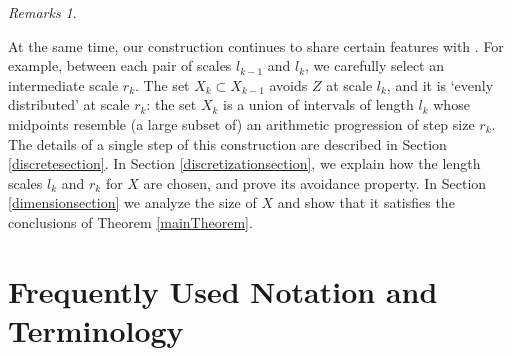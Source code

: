 \documentclass[dvipsnames,letterpaper,12pt]{article}
\numberwithin{equation}{section}
\theoremstyle{plain}
\theoremstyle{remark}
\newtheorem*{remarks}{Remarks}
\begin{document}
\begin{remarks}
\begin{enumerate}[1.]
		At the same time, our construction continues to share certain features with \cite{MalabikaRob}. For example, between each pair of scales $l_{k-1}$ and $l_{k}$, we carefully select an intermediate scale $r_{k}$. The set $X_{k}\subset X_{k-1}$ avoids $Z$ at scale $l_{k}$, and it is `evenly distributed' at scale $r_k$:
		the set $X_{k}$ is a union of intervals of length $l_{k}$ whose midpoints resemble (a large subset of) an arithmetic progression of step size $r_k$. The details of a single step of this construction are described in Section \ref{discretesection}. In Section \ref{discretizationsection}, we explain how the length scales $l_k$ and $r_k$ for $X$ are chosen, and prove its avoidance property. In Section \ref{dimensionsection} we analyze the size of $X$ and show that it satisfies the conclusions of Theorem \ref{mainTheorem}.
	\end{enumerate}
\end{remarks}










\section{Frequently Used Notation and Terminology}\label{notationSection}
\end{document}
